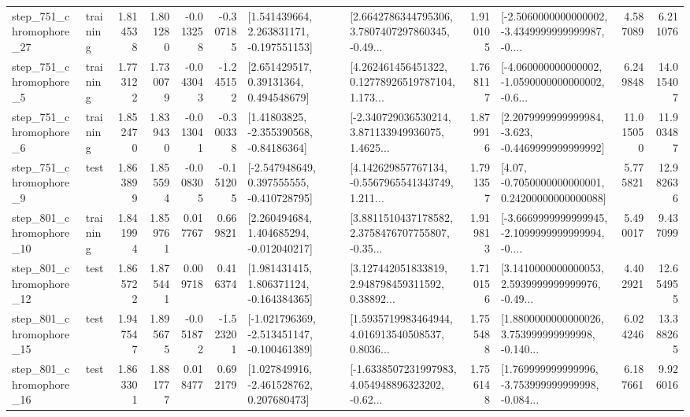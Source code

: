 \begin{tabular}{llrrrrllrlrr}
  step\_751\_chromophore\_27 &  training &      1.814538 &    1.801280 &     -0.013258 & -0.307185 &    [1.541439664, 2.263831171, -0.197551153] &  [2.6642786344795306, 3.7807407297860345, -0.49... &       1.910105 &  [-2.5060000000000002, -3.4349999999999987, -0.... &            4.587089 &          6.211076 \\
   step\_751\_chromophore\_5 &  training &      1.773122 &    1.730079 &     -0.043043 & -1.245152 &      [2.651429517, 0.39131364, 0.494548679] &  [4.262461456451322, 0.12778926519787104, 1.173... &       1.768117 &  [-4.060000000000002, -1.0590000000000002, -0.6... &            6.249848 &         14.015407 \\
   step\_751\_chromophore\_6 &  training &      1.852470 &    1.839430 &     -0.013041 & -0.300338 &     [1.41803825, -2.355390568, -0.84186364] &  [-2.340729036530214, 3.871133949936075, 1.4625... &       1.879916 &  [2.2079999999999984, -3.623, -0.4469999999999992] &           11.015050 &         11.903487 \\
   step\_751\_chromophore\_9 &      test &      1.863899 &    1.855594 &     -0.008305 & -0.151205 &   [-2.547948649, 0.397555555, -0.410728795] &  [4.142629857767134, -0.5567965541343749, 1.211... &       1.791357 &   [4.07, -0.7050000000000001, 0.24200000000000088] &            5.775821 &         12.982636 \\
  step\_801\_chromophore\_10 &  training &      1.841994 &    1.859761 &      0.017767 &  0.669821 &    [2.260494684, 1.404685294, -0.012040217] &  [3.8811510437178582, 2.3758476707755807, -0.35... &       1.919813 &  [-3.6669999999999945, -2.1099999999999994, -0.... &            5.490017 &          9.437099 \\
  step\_801\_chromophore\_12 &      test &      1.865722 &    1.875441 &      0.009718 &  0.416374 &    [1.981431415, 1.806371124, -0.164384365] &  [3.127442051833819, 2.948798459311592, 0.38892... &       1.710156 &  [3.1410000000000053, 2.5939999999999976, -0.49... &            4.402921 &         12.654955 \\
  step\_801\_chromophore\_15 &      test &      1.947547 &    1.895675 &     -0.051872 & -1.523201 &  [-1.021796369, -2.513451147, -0.100461389] &  [1.5935719983464944, 4.016913540508537, 0.8036... &       1.755488 &  [1.8800000000000026, 3.753999999999998, -0.140... &            6.024246 &         13.388265 \\
  step\_801\_chromophore\_16 &      test &      1.863301 &    1.881777 &      0.018477 &  0.692179 &    [1.027849916, -2.461528762, 0.207680473] &  [-1.6338507231997983, 4.054948896323202, -0.62... &       1.756148 &  [1.769999999999996, -3.753999999999998, -0.084... &            6.187661 &          9.926016 \\

\end{tabular}
